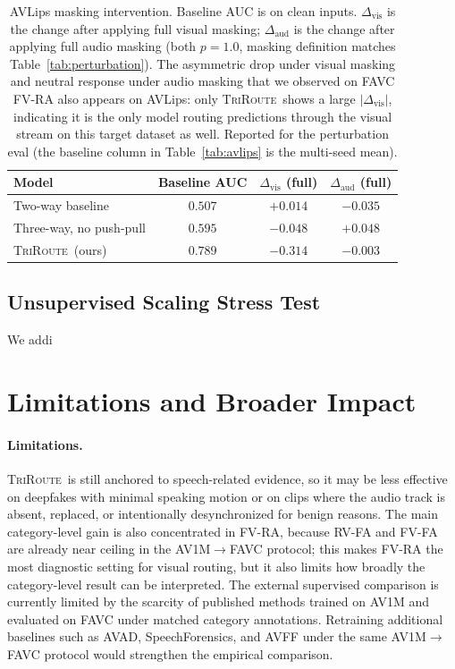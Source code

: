 \documentclass{article}
\newcommand{\method}{\textsc{TriRoute}}
\begin{document}
\begin{table}[t]
    \centering
    \caption{AVLips masking intervention. Baseline AUC is on clean inputs. $\Delta_\mathrm{vis}$ is the change after applying full visual masking; $\Delta_\mathrm{aud}$ is the change after applying full audio masking (both $p=1.0$, masking definition matches Table~\ref{tab:perturbation}). The asymmetric drop under visual masking and neutral response under audio masking that we observed on FAVC FV-RA also appears on AVLips: only \method\ shows a large $|\Delta_\mathrm{vis}|$, indicating it is the only model routing predictions through the visual stream on this target dataset as well. Reported for the perturbation eval (the baseline column in Table~\ref{tab:avlips} is the multi-seed mean).}
    \label{tab:avlips_perturbation}
    \small
    \begin{tabular}{lccc}
        \toprule
        Model & Baseline AUC & $\Delta_\mathrm{vis}$ (full) & $\Delta_\mathrm{aud}$ (full) \\
        \midrule
        Two-way baseline        & $0.507$ & $+0.014$ & $-0.035$ \\
        Three-way, no push-pull & $0.595$ & $-0.048$ & $+0.048$ \\
        \method\ (ours)         & $\mathbf{0.789}$ & $\mathbf{-0.314}$ & $-0.003$ \\
        \bottomrule
    \end{tabular}
\end{table}

\subsection{Unsupervised Scaling Stress Test}
\label{sec:scaling_stress}

We addi
\section{Limitations and Broader Impact}

\paragraph{Limitations.}
\method\ is still anchored to speech-related evidence, so it may be less effective on deepfakes with minimal speaking motion or on clips where the audio track is absent, replaced, or intentionally desynchronized for benign reasons. The main category-level gain is also concentrated in FV-RA, because RV-FA and FV-FA are already near ceiling in the AV1M$\rightarrow$FAVC protocol; this makes FV-RA the most diagnostic setting for visual routing, but it also limits how broadly the category-level result can be interpreted. The external supervised comparison is currently limited by the scarcity of published methods trained on AV1M and evaluated on FAVC under matched category annotations. Retraining additional baselines such as AVAD, SpeechForensics, and AVFF under the same AV1M$\rightarrow$FAVC protocol would strengthen the empirical comparison.
\end{document}
